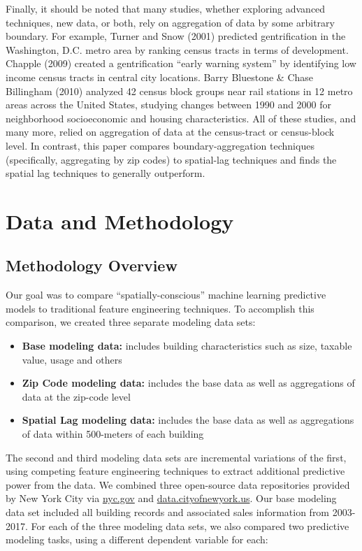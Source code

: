 \documentclass[12pt,]{article}
\providecommand{\tightlist}{%
  \setlength{\itemsep}{0pt}\setlength{\parskip}{0pt}}
\begin{document}
Finally, it should be noted that many studies, whether exploring
advanced techniques, new data, or both, rely on aggregation of data by
some arbitrary boundary. For example, Turner and Snow (2001) predicted
gentrification in the Washington, D.C. metro area by ranking census
tracts in terms of development. Chapple (2009) created a gentrification
``early warning system'' by identifying low income census tracts in
central city locations. Barry Bluestone \& Chase Billingham (2010)
analyzed 42 census block groups near rail stations in 12 metro areas
across the United States, studying changes between 1990 and 2000 for
neighborhood socioeconomic and housing characteristics. All of these
studies, and many more, relied on aggregation of data at the
census-tract or census-block level. In contrast, this paper compares
boundary-aggregation techniques (specifically, aggregating by zip codes)
to spatial-lag techniques and finds the spatial lag techniques to
generally outperform.

\hypertarget{data-and-methodology}{%
\section{Data and Methodology}\label{data-and-methodology}}

\hypertarget{methodology-overview}{%
\subsection{Methodology Overview}\label{methodology-overview}}

Our goal was to compare ``spatially-conscious'' machine learning
predictive models to traditional feature engineering techniques. To
accomplish this comparison, we created three separate modeling data
sets:

\begin{itemize}
\tightlist
\item
  \textbf{Base modeling data:} includes building characteristics such as
  size, taxable value, usage and others
\item
  \textbf{Zip Code modeling data:} includes the base data as well as
  aggregations of data at the zip-code level
\item
  \textbf{Spatial Lag modeling data:} includes the base data as well as
  aggregations of data within 500-meters of each building
\end{itemize}

\noindent The second and third modeling data sets are incremental
variations of the first, using competing feature engineering techniques
to extract additional predictive power from the data. We combined three
open-source data repositories provided by New York City via
\url{nyc.gov} and \url{data.cityofnewyork.us}. Our base modeling data
set included all building records and associated sales information from
2003-2017. For each of the three modeling data sets, we also compared
two predictive modeling tasks, using a different dependent variable for
each:
\end{document}
